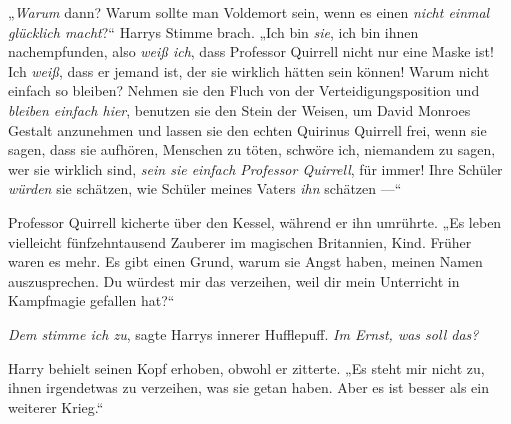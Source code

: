 „\emph{Warum} dann? Warum sollte man Voldemort sein, wenn es einen \emph{nicht einmal glücklich macht}?“
Harrys Stimme brach.
„Ich bin \emph{sie}, ich bin ihnen nachempfunden, also \emph{weiß ich}, dass Professor Quirrell nicht nur eine Maske ist! Ich \emph{weiß}, dass er jemand ist, der sie wirklich hätten sein können! Warum nicht einfach so bleiben? Nehmen sie den Fluch von der Verteidigungsposition und \emph{bleiben einfach hier}, benutzen sie den Stein der Weisen, um David Monroes Gestalt anzunehmen und lassen sie den echten Quirinus Quirrell frei, wenn sie sagen, dass sie aufhören, Menschen zu töten, schwöre ich, niemandem zu sagen, wer sie wirklich sind, \emph{sein sie einfach Professor Quirrell}, für immer! Ihre Schüler \emph{würden} sie schätzen, wie Schüler meines Vaters \emph{ihn} schätzen —“

Professor Quirrell kicherte über den Kessel, während er ihn umrührte.
„Es leben vielleicht fünfzehntausend Zauberer im magischen Britannien, Kind. Früher waren es mehr. Es gibt einen Grund, warum sie Angst haben, meinen Namen auszusprechen. Du würdest mir das verzeihen, weil dir mein Unterricht in Kampfmagie gefallen hat?“

\emph{Dem stimme ich zu}, sagte Harrys innerer Hufflepuff. \emph{Im Ernst, was soll das?}

Harry behielt seinen Kopf erhoben, obwohl er zitterte.
„Es steht mir nicht zu, ihnen irgendetwas zu verzeihen, was sie getan haben. Aber es ist besser als ein weiterer Krieg.“

